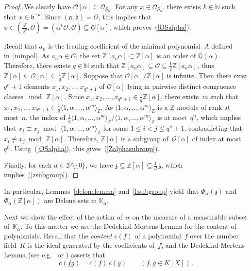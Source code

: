 \documentclass[12pt]{amsart}
\theoremstyle{definition}
\theoremstyle{remark}
\numberwithin{equation}{section}
\begin{document}
\begin{proof}
We clearly have $\mathcal{O}[\alpha] \subseteq \mathcal{O}_{S_\alpha}$.
For any $x \in \mathcal{O}_{S_\alpha}$, there exists $k \in \mathbb{N}$ such that $x \in \mathfrak{b}^{-k}$.
Since $(\mathfrak{a}, \mathfrak{b}) = \mathcal{O}$, this implies that $x \in (\frac{\mathfrak{a}^k}{\mathfrak{b}^k}, \mathcal{O}) = (\alpha^k \mathcal{O}, \mathcal{O}) \subseteq \mathcal{O}[\alpha]$, which proves~(\ref{OSalpha}).

Recall that $a_n$ is the leading coefficient of the minimal polynomial~$A$ defined in~\eqref{minpol}. As $a_n \alpha \in \mathcal{O}$, the set $\mathbb{Z}[a_n\alpha] \subset \mathbb{Z}[\alpha]$ is an order of $\mathbb{Q}(\alpha)$.
Therefore, there exists $q \in \mathbb{N}$ such that $\mathbb{Z}[a_n \alpha] \subseteq \mathcal{O} \subseteq \frac1q \mathbb{Z}[a_n \alpha]$, thus $\mathbb{Z}[\alpha] \subseteq \mathcal{O}[\alpha] \subseteq \frac1q \mathbb{Z}[\alpha]$.
Suppose that $\mathcal{O}[\alpha] / \mathbb{Z}[\alpha]$ is infinite.
Then there exist $q^n+1$ elements $x_1, x_2, \ldots, x_{q^n+1}$ of $\mathcal{O}[\alpha]$ lying in pairwise distinct congruence classes $\bmod\, \mathbb{Z}[\alpha]$.
Since $x_1, x_2, \ldots, x_{q^n+1} \in \frac{1}{q} \mathbb{Z}[\alpha]$, there exists~$m$ such that $x_1, x_2, \ldots, x_{q^n+1} \in \frac{1}{q} \langle 1, \alpha, \ldots, \alpha^m \rangle_\mathbb{Z}$.
As $\langle 1, \alpha, \ldots, \alpha^m \rangle_\mathbb{Z}$ is a $\mathbb{Z}$-module of rank at most~$n$, the index of $\frac{1}{q} \langle 1, \alpha, \ldots, \alpha^m \rangle_\mathbb{Z} / \langle 1, \alpha, \ldots, \alpha^m \rangle_\mathbb{Z}$ is at most~$q^n$, which implies that $x_i \equiv x_j \bmod\, \langle 1, \alpha, \ldots, \alpha^m \rangle_\mathbb{Z}$ for some $1 \le i < j \le q^n+1$, contradicting that $x_i \not\equiv x_j \bmod\, \mathbb{Z}[\alpha]$.
Therefore, $\mathbb{Z}[\alpha]$ is a subgroup of~$\mathcal{O}[\alpha]$ of index at most~$q^n$.
Using~(\ref{OSalpha}), this gives~(\ref{Zalphasubroup}).

Finally, for each $d \in \mathcal{D} \setminus \{0\}$, we have $\mathfrak{z} \subseteq \mathbb{Z}[\alpha] \subseteq \frac{1}{d}\, \mathfrak{z}$, which implies~(\ref{zsubgroup}).
\end{proof}

In particular, Lemmas~\ref{delonelemma} and~\ref{l:subgroup} yield that $\Phi_\alpha(\mathfrak{z})$ and $\Phi_\alpha(\mathbb{Z}[\alpha])$ are Delone sets in $\mathbb{K}_\alpha$.

Next we show the effect of the action of~$\alpha$ on the measure of a measurable subset of~$\mathbb{K}_\alpha$. To this matter we use the Dedekind-Mertens Lemma for the content of polynomials.
Recall that the \emph{content} $c(f)$ of a polynomial~$f$ over the number field~$K$ is the ideal generated by the coefficients of~$f$, and the Dedekind-Mertens Lemma (see e.g.\ \cite[Section~8]{Anderson:00} or \cite[\S9]{Prufer:32}) asserts that
\begin{equation}\label{DMlemma}
c(f g) = c(f)\, c(g) \qquad (f, g \in K[X])\,.
\end{equation}
\end{document}
